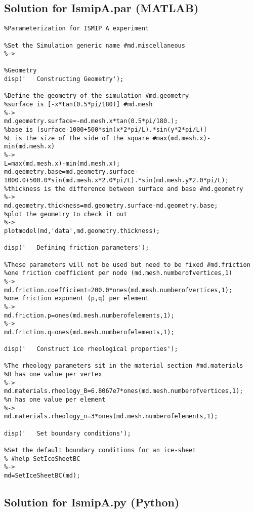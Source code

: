 \subsection{Solution for IsmipA.par (MATLAB)}%
\begin{verbatim}%Parameterization for ISMIP A experiment

%Set the Simulation generic name #md.miscellaneous
%->

%Geometry
disp('   Constructing Geometry');

%Define the geometry of the simulation #md.geometry
%surface is [-x*tan(0.5*pi/180)] #md.mesh
%->
md.geometry.surface=-md.mesh.x*tan(0.5*pi/180.);
%base is [surface-1000+500*sin(x*2*pi/L).*sin(y*2*pi/L)]
%L is the size of the side of the square #max(md.mesh.x)-min(md.mesh.x)
%->
L=max(md.mesh.x)-min(md.mesh.x);
md.geometry.base=md.geometry.surface-1000.0+500.0*sin(md.mesh.x*2.0*pi/L).*sin(md.mesh.y*2.0*pi/L);
%thickness is the difference between surface and base #md.geometry
%->
md.geometry.thickness=md.geometry.surface-md.geometry.base;
%plot the geometry to check it out
%->
plotmodel(md,'data',md.geometry.thickness);

disp('   Defining friction parameters');

%These parameters will not be used but need to be fixed #md.friction
%one friction coefficient per node (md.mesh.numberofvertices,1)
%->
md.friction.coefficient=200.0*ones(md.mesh.numberofvertices,1);
%one friction exponent (p,q) per element
%->
md.friction.p=ones(md.mesh.numberofelements,1);
%->
md.friction.q=ones(md.mesh.numberofelements,1);

disp('   Construct ice rheological properties');

%The rheology parameters sit in the material section #md.materials
%B has one value per vertex
%->
md.materials.rheology_B=6.8067e7*ones(md.mesh.numberofvertices,1);
%n has one value per element
%->
md.materials.rheology_n=3*ones(md.mesh.numberofelements,1);

disp('   Set boundary conditions');

%Set the default boundary conditions for an ice-sheet
% #help SetIceSheetBC
%->
md=SetIceSheetBC(md);\end{verbatim}
\subsection{Solution for IsmipA.py (Python)}%
\begin{verbatim}
\end{verbatim}
